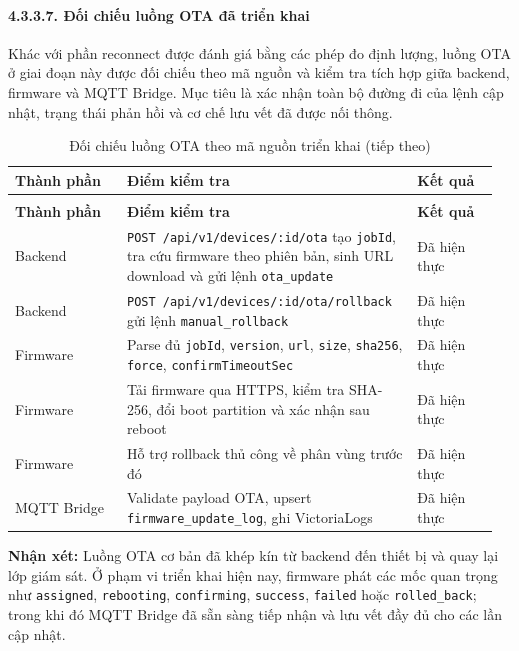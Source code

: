 \documentclass[a4paper]{extarticle}
\newcommand{\thesissettableid}[2]{%
  \renewcommand{\thetable}{#1}%
  \renewcommand{\theHtable}{#2}%
}
\begin{document}
\paragraph{4.3.3.7. Đối chiếu luồng OTA đã triển
khai}\label{4337-ux111ux1ed1i-chiux1ebfu-luux1ed3ng-ota-ux111uxe3-triux1ec3n-khai}

Khác với phần reconnect được đánh giá bằng các phép đo định lượng, luồng
OTA ở giai đoạn này được đối chiếu theo mã nguồn và kiểm tra tích hợp
giữa backend, firmware và MQTT Bridge. Mục tiêu là xác nhận toàn bộ
đường đi của lệnh cập nhật, trạng thái phản hồi và cơ chế lưu vết đã
được nối thông.


{\thesissettableid{4.25A}{tab-ch4-oi-chieu-luong-ota-theo-ma-nguon-trien-khai}
\def\LTcaptype{table}
\begin{longtable}{|L{0.224\linewidth}|L{0.580\linewidth}|L{0.160\linewidth}|}
\caption{Đối chiếu luồng OTA theo mã nguồn triển khai}\label{tab:ch4-oi-chieu-luong-ota-theo-ma-nguon-trien-khai}\\
\hline \textbf{Thành phần} & \textbf{Điểm kiểm tra} & \textbf{Kết quả} \\
\hline
\endfirsthead
\caption[]{Đối chiếu luồng OTA theo mã nguồn triển khai (tiếp theo)}\\
\hline \textbf{Thành phần} & \textbf{Điểm kiểm tra} & \textbf{Kết quả} \\
\hline
\endhead
\hline
\endfoot
\endlastfoot
Backend & \nolinkurl{POST /api/v1/devices/:id/ota} tạo \texttt{jobId}, tra
cứu firmware theo phiên bản, sinh URL download và gửi lệnh
\texttt{ota\_update} & Đã hiện thực \\\hline
Backend & \nolinkurl{POST /api/v1/devices/:id/ota/rollback} gửi lệnh
\texttt{manual\_rollback} & Đã hiện thực \\\hline
Firmware & Parse đủ \texttt{jobId}, \texttt{version}, \texttt{url},
\texttt{size}, \texttt{sha256}, \texttt{force},
\texttt{confirmTimeoutSec} & Đã hiện thực \\\hline
Firmware & Tải firmware qua HTTPS, kiểm tra SHA-256, đổi boot partition
và xác nhận sau reboot & Đã hiện thực \\\hline
Firmware & Hỗ trợ rollback thủ công về phân vùng trước đó & Đã hiện
thực \\\hline
MQTT Bridge & Validate payload OTA, upsert
\texttt{firmware\_update\_log}, ghi VictoriaLogs & Đã hiện thực \\\hline
\end{longtable}
}


\textbf{Nhận xét:} Luồng OTA cơ bản đã khép kín từ backend đến thiết bị
và quay lại lớp giám sát. Ở phạm vi triển khai hiện nay, firmware phát
các mốc quan trọng như \texttt{assigned}, \texttt{rebooting},
\texttt{confirming}, \texttt{success}, \texttt{failed} hoặc
\texttt{rolled\_back}; trong khi đó MQTT Bridge đã sẵn sàng tiếp nhận và
lưu vết đầy đủ cho các lần cập nhật.
\end{document}
